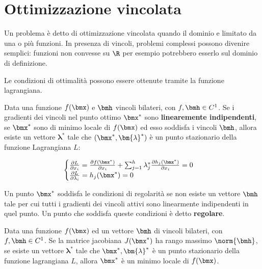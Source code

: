 \documentclass[\main/main.tex]{subfiles}
\begin{document}
\chapter{Ottimizzazione vincolata}
Un problema è detto di ottimizzazione vincolata quando il dominio e limitato da una o più funzioni. In presenza di vincoli, problemi complessi possono divenire semplici: funzioni non convesse su \(\R \) per esempio potrebbero esserlo sul dominio di definizione.

Le condizioni di ottimalità possono essere ottenute tramite la funzione lagrangiana.

\begin{theorem}
    Data una funzione \(f(\bmx)\) e \(\bmh \) vincoli bilateri, con \(f,\bmh \in C^1\). Se i gradienti dei vincoli nel punto ottimo \(\bmx^*\) sono \textbf{linearemente indipendenti}, se \(\bmx^*\) sono di minimo locale di \(f(\bmx)\) ed esso soddisfa i vincoli \(\bmh \), allora esiste un vettore \(\bm{\lambda}^*\) tale che \((\bmx^*, \bm{\lambda}^*)\) è un punto stazionario della funzione Lagrangiana \(L\):

    \[
        \begin{cases}
            \frac{\partial L}{\partial x_i} = \frac{\partial f(\bmx^*)}{\partial x_i} + \sum^h_{j=1} \lambda_j^* \frac{\partial h_j(\bmx^*)}{\partial x_i} = 0\\
            \frac{\partial L}{\partial \lambda_i} = h_j(\bmx^*) = 0
        \end{cases}
    \]
\end{theorem}

\begin{definition}
    Un punto \(\bmx^*\) soddisfa le condizioni di regolarità se non esiste un vettore \(\bmh \) tale per cui tutti i gradienti dei vincoli attivi sono linearmente indipendenti in quel punto. Un punto che soddisfa queste condizioni è detto \textbf{regolare}.
\end{definition}

\begin{theorem}
	Data una funzione \(f(\bmx)\) ed un vettore \(\bmh \) di vincoli bilateri, con \(f, \bmh \in C^1\). Se la matrice jacobiana \(J(\bmx^*)\) ha rango massimo \(\norm{\bmh}\), se esiste un vettore \(\bm{\lambda}^*\) tale che \(\bmx^*, \bm{\lambda}^*\) è un punto stazionario della funzione lagrangiana \(L\), allora \(\bmx^*\) è un minimo locale di \(f(\bmx)\).
\end{theorem}
\end{document}
